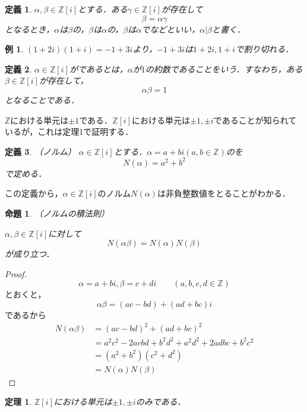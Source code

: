 \documentclass[dvipdfmx]{jsarticle}
\newtheorem{theorem}{定理}
\newtheorem{proposition}{命題}
\newtheorem{defnition}{定義}
\newtheorem{example}{例}
\begin{document}
\begin{defnition}
$\alpha,\beta\in\mathbb{Z}[i]$とする．ある$\gamma\in\mathbb{Z}[i]$が存在して
$$\beta=\alpha\gamma$$
となるとき，$\alpha$は$\beta$の，$\beta$は$\alpha$の，$\beta$は$\alpha$でなどといい，$\alpha|\beta$と書く．
\end{defnition}

\begin{example}
$(1+2i)(1+i)=-1+3i$より，$-1+3i$は$1+2i,1+i$で割り切れる．
\end{example}

\begin{defnition}
$\alpha\in\mathbb{Z}[i]$がであるとは，$\alpha$が$1$の約数であることをいう．すなわち，ある$\beta\in\mathbb{Z}[i]$が存在して，
$$\alpha\beta=1$$
となることである．
\end{defnition}

$\mathbb{Z}$における単元は$\pm1$である．$\mathbb{Z}[i]$における単元は$\pm1,\pm i$であることが知られているが，これは定理1で証明する．

\begin{defnition}{（ノルム）}
$\alpha\in\mathbb{Z}[i]$とする．$\alpha=a+bi(a,b\in\mathbb{Z})$のを
$$N(\alpha)=a^2+b^2$$
で定める．
\end{defnition}

この定義から，$\alpha\in\mathbb{Z}[i]$のノルム$N(\alpha)$は非負整数値をとることがわかる．


\begin{proposition}{（ノルムの積法則）}

$\alpha,\beta\in\mathbb{Z}[i]$に対して
$$N(\alpha\beta)=N(\alpha)N(\beta)$$
が成り立つ．
\end{proposition}

\begin{proof}
$$\alpha=a+bi,\beta=c+di\qquad(a,b,c,d\in\mathbb{Z})$$
とおくと，
$$\alpha\beta=(ac-bd)+(ad+bc)i$$
であるから
\begin{align*}
N(\alpha\beta)&=(ac-bd)^2+(ad+bc)^2\\
&=a^2c^2-2acbd+b^2d^2+a^2d^2+2adbc+b^2c^2\\
&=(a^2+b^2)(c^2+d^2)\\
&=N(\alpha)N(\beta)
\end{align*}
\end{proof}

\begin{theorem}
$\mathbb{Z}[i]$における単元は$\pm1,\pm i$のみである．
\end{theorem}
\end{document}
